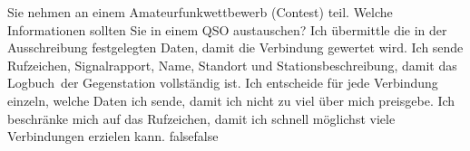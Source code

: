     {Sie nehmen an einem Amateurfunkwettbewerb (Contest) teil. Welche Informationen sollten Sie in einem QSO austauschen?}
    {Ich übermittle die in der Ausschreibung festgelegten Daten, damit die Verbindung gewertet wird.}
    {Ich sende Rufzeichen, Signalrapport, Name, Standort und Stationsbeschreibung, damit das Logbuch der Gegenstation vollständig ist.}
    {Ich entscheide für jede Verbindung einzeln, welche Daten ich sende, damit ich nicht zu viel über mich preisgebe.}
    {Ich beschränke mich auf das Rufzeichen, damit ich schnell möglichst viele Verbindungen erzielen kann.}
    {false}{false}